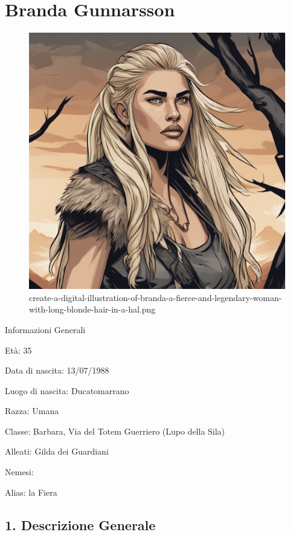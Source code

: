 \section{Branda Gunnarsson}\label{branda-gunnarsson}


\begin{figure}
\centering
\includegraphics{create-a-digital-illustration-of-branda-a-fierce-and-legendary-woman-with-long-blonde-hair-in-a-hal.png}
\caption{create-a-digital-illustration-of-branda-a-fierce-and-legendary-woman-with-long-blonde-hair-in-a-hal.png}
\end{figure}

Informazioni Generali

Età: 35

Data di nascita: 13/07/1988

Luogo di nascita: Ducatomarrano

Razza: Umana

Classe: Barbara, Via del Totem Guerriero (Lupo della Sila)

Alleati: Gilda dei Guardiani

Nemesi:

Alias: la Fiera


\subsection{1. Descrizione Generale}\label{descrizione-generale}


